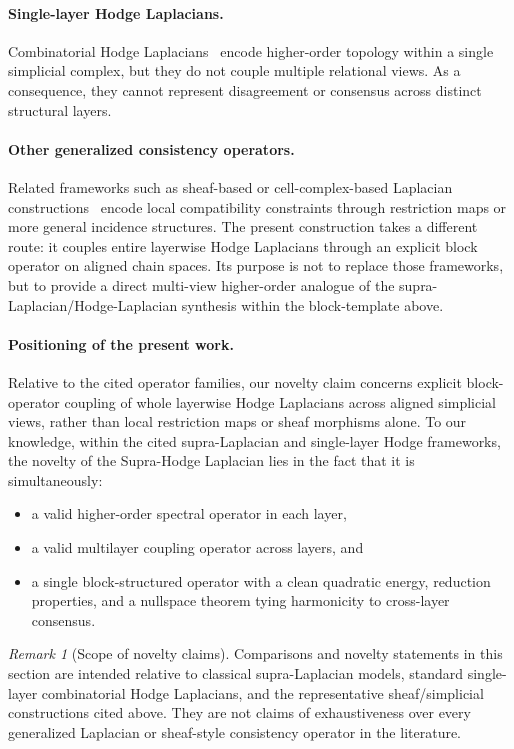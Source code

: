 \documentclass[11pt]{article}
\theoremstyle{definition}
\theoremstyle{remark}
\newtheorem{remark}[theorem]{Remark}
\begin{document}
\paragraph{Single-layer Hodge Laplacians.}
Combinatorial Hodge Laplacians~\cite{horak2013,schaub2020,lim2020} encode higher-order topology within a single simplicial complex, but they do not couple multiple relational views. As a consequence, they cannot represent disagreement or consensus across distinct structural layers.

\paragraph{Other generalized consistency operators.}
Related frameworks such as sheaf-based or cell-complex-based Laplacian constructions~\cite{hansen2020,bodnar2021} encode local compatibility constraints through restriction maps or more general incidence structures. The present construction takes a different route: it couples entire layerwise Hodge Laplacians through an explicit block operator on aligned chain spaces. Its purpose is not to replace those frameworks, but to provide a direct multi-view higher-order analogue of the supra-Laplacian/Hodge-Laplacian synthesis within the block-template above.

\paragraph{Positioning of the present work.}
Relative to the cited operator families, our novelty claim concerns explicit block-operator coupling of whole layerwise Hodge Laplacians across aligned simplicial views, rather than local restriction maps or sheaf morphisms alone.
To our knowledge, within the cited supra-Laplacian and single-layer Hodge frameworks, the novelty of the Supra-Hodge Laplacian lies in the fact that it is simultaneously:
\begin{itemize}
    \item a valid higher-order spectral operator in each layer,
    \item a valid multilayer coupling operator across layers, and
    \item a single block-structured operator with a clean quadratic energy, reduction properties, and a nullspace theorem tying harmonicity to cross-layer consensus.
\end{itemize}

\begin{remark}[Scope of novelty claims]
Comparisons and novelty statements in this section are intended relative to
classical supra-Laplacian models, standard single-layer combinatorial Hodge
Laplacians, and the representative sheaf/simplicial constructions cited above.
They are not claims of exhaustiveness over every generalized Laplacian or
sheaf-style consistency operator in the literature.
\end{remark}
\end{document}
